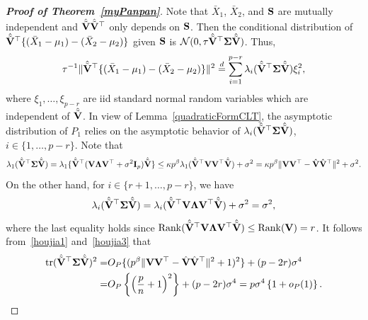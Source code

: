 \documentclass[times,sort&compress,3p]{elsarticle}
\newcommand{\mytr}{ {\rm tr} }
\newcommand{\myrank}{{\rm Rank}}
\theoremstyle{plain}
\theoremstyle{definition}
\theoremstyle{remark}
\begin{document}
\begin{appendices}
\begin{proof}[\textbf{Proof of Theorem~\ref{myPanpan}}]
    Note that $\bar{X}_1$, $\bar{X}_2$, and $\mathbf{S}$ are mutually independent and $\hat{\tilde{\mathbf{V}}}\hat{\tilde{\mathbf{V}}}^\top $ only depends on $\mathbf{S}$.
    Then the conditional distribution of
    $\hat{\tilde{\mathbf{V}}}^\top \{(\bar{X}_1-\mu_1)-(\bar{X}_2-\mu_2)\}$ given $\mathbf{S}$ is $\mathcal{N}(0,\tau \hat{\tilde{\mathbf{V}}}^\top \boldsymbol{\Sigma}\hat{\tilde{\mathbf{V}}})$.
    Thus,
\begin{equation}\label{houjia2}
    \tau^{-1}\|\hat{\tilde{\mathbf{V}}}^\top \{(\bar{X}_1-\mu_1)-(\bar{X}_2-\mu_2)\}\|^2
    \overset{d}{=}
    \sum_{i=1}^{p-r} \lambda_i(\hat{\tilde{\mathbf{V}}}^\top \boldsymbol{\Sigma}\hat{\tilde{\mathbf{V}}})\xi_i^2,
\end{equation}
where $\xi_1,\ldots,\xi_{p-r}$ are iid  standard normal random variables which are independent of $\hat{\tilde{\mathbf{V}}}$.
In view of Lemma~\ref{quadraticFormCLT}, the asymptotic distribution of $P_1$ relies on the asymptotic behavior of $\lambda_i(\hat{\tilde{\mathbf{V}}}^\top \boldsymbol{\Sigma}\hat{\tilde{\mathbf{V}}})$, $i\in\{1,\ldots, p-r\}$.
     Note that
     \begin{equation}\label{houjia1}
     \lambda_1(\hat{\tilde{\mathbf{V}}}^\top \boldsymbol{\Sigma}\hat{\tilde{\mathbf{V}}})
             =
         \lambda_1\{\hat{\tilde{\mathbf{V}}}^\top  (\mathbf{V}\boldsymbol{\Lambda} \mathbf{V}^\top  +\sigma^2 \mathbf{I}_p) \hat{\tilde{\mathbf{V}}}\}
         \leq 
     \kappa p^{\beta}\lambda_1(\hat{\tilde{\mathbf{V}}}^\top  \mathbf{V} \mathbf{V}^\top \hat{\tilde{\mathbf{V}}})+\sigma^2
     =
    \kappa p^\beta \|\mathbf{V}\mathbf{V}^\top  -\hat{\mathbf{V}}\hat{\mathbf{V}}^\top \|^2+\sigma^2.
     \end{equation}
    On the other hand,
    for $i\in\{r+1,\ldots,p-r\}$,
    we have
    \begin{equation}\label{houjia3}
    \lambda_i(\hat{\tilde{\mathbf{V}}}^\top \boldsymbol{\Sigma}\hat{\tilde{\mathbf{V}}})
    =
    \lambda_i(\hat{\tilde{\mathbf{V}}}^\top  \mathbf{V} \boldsymbol{\Lambda} \mathbf{V}^\top  \hat{\tilde{\mathbf{V}}})+\sigma^2
    =\sigma^2,
    \end{equation}
where the last equality holds since $\myrank(\hat{\tilde{\BV}}^\top  \BV \bLambda \BV^\top  \hat{\tilde{\BV}})\leq \myrank(\BV)=r$.
It follows from~\eqref{houjia1} and~\eqref{houjia3} that
\begin{equation}\label{traceA1}
    \begin{aligned}
        \mytr(\hat{\tilde{\BV}}^\top \bSigma\hat{\tilde{\BV}})^2=&
    O_P\{(p^{\beta}\|\BV\BV^\top -\hat{\BV}\hat{\BV}^\top \|^2+1)^2\}
    +
    (p-2r)\sigma^4\\
    =&
O_P\left\{\left(\frac{p}{n}+1\right)^2\right\}
    +
    (p-2r)\sigma^4
    =p\sigma^4\left\{1+o_P(1)\right\}.
    \end{aligned}
\end{equation}

\end{proof}
\end{appendices}
\end{document}
